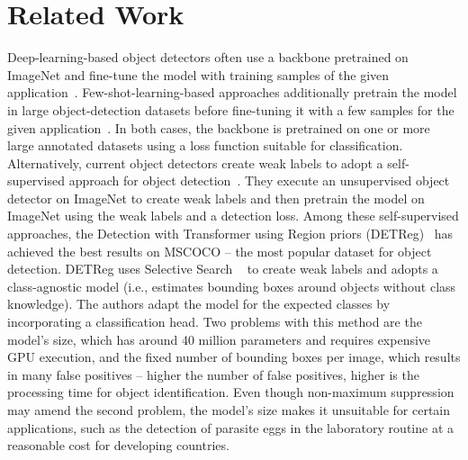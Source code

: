 \documentclass[10pt,twocolumn,twoside]{IEEEtran}
\begin{document}
\section{Related Work}\label{sec:related-work}
     Deep-learning-based object detectors often use a backbone pretrained on ImageNet and fine-tune the model with training samples of the given application~\cite{liu2020deep,huang2021survey}. Few-shot-learning-based approaches additionally pretrain the model in large object-detection datasets before fine-tuning it with a few samples for the given application~\cite{kang2019few,wu2020multi,yan2019meta}. In both cases, the backbone is pretrained on one or more large annotated datasets using a loss function suitable for classification. Alternatively, current object detectors create weak labels to adopt a self-supervised approach for object detection~\cite{bar2021detreg,o2020unsupervised,wei2021aligning,yang2021instance}. They execute an unsupervised object detector on ImageNet to create weak labels and then pretrain the model on ImageNet using the weak labels and a detection loss. Among these self-supervised approaches, the Detection with Transformer using Region priors (DETReg)~\cite{bar2021detreg} has achieved the best results on MSCOCO \cite{lin2014microsoft} -- the most popular dataset for object detection. DETReg uses Selective Search ~\cite{uijlings2013selective} to create weak labels and adopts a class-agnostic model (i.e., estimates bounding boxes around objects without class knowledge). The authors adapt the model for the expected classes by incorporating a classification head. Two problems with this method are the model's size, which has around 40 million parameters and requires expensive GPU execution, and the fixed number of bounding boxes per image, which results in many false positives --  higher the number of false positives, higher is the processing time for object identification. Even though non-maximum suppression may amend the second problem, the model's size makes it unsuitable for certain applications, such as the detection of parasite eggs in the laboratory routine at a reasonable cost for developing countries.
\end{document}
